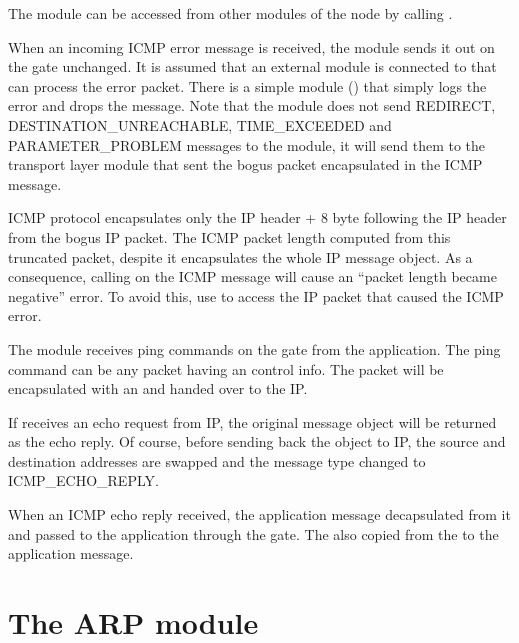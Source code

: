 The  module can be accessed from other modules of the node by calling
.

When an incoming ICMP error message is received, the  module
sends it out on the  gate unchanged. It is assumed that an
external module is connected to  that can process the error
packet. There is a simple module () that simply
logs the error and drops the message. Note that the  module
does not send REDIRECT, DESTINATION\_UNREACHABLE,
TIME\_EXCEEDED and PARAMETER\_PROBLEM messages to the  module,
it will send them to the transport layer module that sent the bogus
packet encapsulated in the ICMP message.
\begin{note}
ICMP protocol encapsulates only the IP header + 8 byte following the IP header
from the bogus IP packet. The ICMP packet length computed from this truncated
packet, despite it encapsulates the whole IP message object.
As a consequence, calling  on the ICMP message
will cause an ``packet length became negative'' error. To avoid this,
use  to access the IP packet that caused the ICMP
error.
\end{note}

The  module receives ping commands on the 
gate from the application. The ping command can be any packet
having an  control info. The packet
will be encapsulated with an  and
handed over to the IP.

If  receives an echo request from IP, the original
message object will be returned as the echo reply. Of course,
before sending back the object to IP, the source and destination
addresses are swapped and the message type changed to ICMP\_ECHO\_REPLY.

When an ICMP echo reply received, the application message decapsulated
from it and passed to the application through the  gate.
The  also copied from the 
to the application message.



\section{The ARP module}

